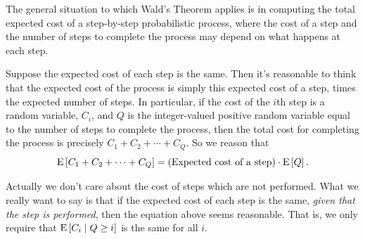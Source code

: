 \documentclass[11pt,twoside]{article}
\begin{document}
The general situation to which Wald's Theorem applies is in computing the
total expected cost of a step-by-step probabilistic process, where the
cost of a step and the number of steps to complete the process may depend
on what happens at each step.

Suppose the expected cost of each step is the same.  Then it's reasonable
to think that the expected cost of the process is simply this expected
cost of a step, times the expected number of steps.  In particular, if the
cost of the $i$th step is a random variable, $C_i$, and $Q$ is the
integer-valued positive random variable equal to the number of steps to
complete the process, then the total cost for completing the process is
precisely $C_1 + C_2 + \cdots + C_Q$.  So we reason that
\[
    \mathop{\textup{E}}\nolimits\left[C_1 + C_2 + \cdots + C_Q\right] = (\text{Expected cost of a step})
    \cdot \mathop{\textup{E}}\nolimits\left[Q\right].
\]

Actually we don't care about the cost of steps which are not performed.
What we really want to say is that if the expected cost of each step is
the same, \emph{given that the step is performed}, then the equation above
seems reasonable.  That is, we only require that $\mathop{\textup{E}}\nolimits\left[C_i\mid Q \geq i\right]$
is the same for all $i$.

\end{document}

